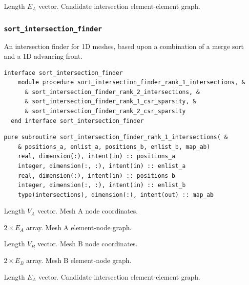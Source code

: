 \documentclass{article}
\begin{document}
\begin{description}[font=\ttfamily\bfseries,leftmargin=2.2\parindent,labelindent=1.7\parindent,noitemsep]
  \item[ints] Length $E_A$ vector. Candidate intersection element-element graph.
\end{description}

\subsubsection{\texttt{sort\_intersection\_finder}}

An intersection finder for 1D meshes, based upon a combination of a merge sort
and a 1D advancing front.

\begin{lstlisting}[language=FORTRAN]
  interface sort_intersection_finder
    module procedure sort_intersection_finder_rank_1_intersections, &
      & sort_intersection_finder_rank_2_intersections, &
      & sort_intersection_finder_rank_1_csr_sparsity, &
      & sort_intersection_finder_rank_2_csr_sparsity
  end interface sort_intersection_finder
\end{lstlisting}

\begin{lstlisting}[language=FORTRAN]
  pure subroutine sort_intersection_finder_rank_1_intersections( &
    & positions_a, enlist_a, positions_b, enlist_b, map_ab)
    real, dimension(:), intent(in) :: positions_a
    integer, dimension(:, :), intent(in) :: enlist_a
    real, dimension(:), intent(in) :: positions_b
    integer, dimension(:, :), intent(in) :: enlist_b
    type(intersections), dimension(:), intent(out) :: map_ab
\end{lstlisting}

\begin{description}[font=\ttfamily\bfseries,leftmargin=2.2\parindent,labelindent=1.7\parindent,noitemsep]
  \item[positions\_a] Length $V_A$ vector. Mesh A node coordinates.
  \item[enlist\_a] $2 \times E_A$ array. Mesh A element-node graph.
  \item[positions\_b] Length $V_B$ vector. Mesh B node coordinates.
  \item[enlist\_b] $2 \times E_B$ array. Mesh B element-node graph.
  \item[map\_ab] Length $E_A$ vector. Candidate intersection element-element
    graph.
\end{description}
\end{document}
